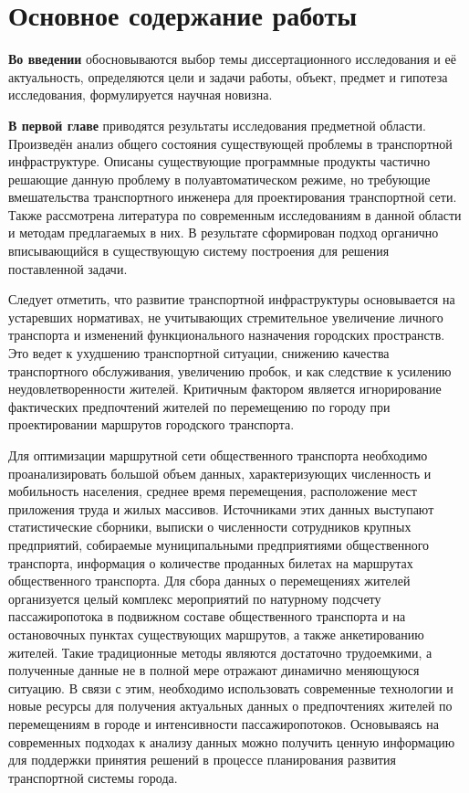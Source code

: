 \section{Основное содержание работы}
\textbf{Во введении} обосновываются выбор темы диссертационного исследования и её актуальность, определяются 
цели и задачи работы, объект, предмет и гипотеза исследования, формулируется научная новизна.

\textbf{В первой главе} приводятся результаты исследования предметной области. Произведён анализ общего 
состояния существующей проблемы в транспортной инфраструктуре. Описаны существующие программные продукты 
частично решающие данную проблему в полуавтоматическом режиме, но требующие вмешательства транспортного 
инженера для проектирования транспортной сети. Также рассмотрена литература по современным исследованиям в 
данной области и методам предлагаемых в них. В результате сформирован подход органично вписывающийся в 
существующую систему построения для решения поставленной задачи.

Следует отметить, что развитие транспортной инфраструктуры основывается на устаревших нормативах, не 
учитывающих стремительное увеличение личного транспорта и изменений функционального назначения городских 
пространств. Это ведет к ухудшению транспортной ситуации, снижению качества транспортного обслуживания, 
увеличению пробок, и как следствие к усилению неудовлетворенности жителей. Критичным фактором является 
игнорирование фактических предпочтений жителей по перемещению по городу при проектировании маршрутов 
городского транспорта.

Для оптимизации маршрутной сети общественного транспорта необходимо проанализировать большой объем данных, 
характеризующих численность и мобильность населения, среднее время перемещения, расположение мест приложения 
труда и жилых массивов. Источниками этих данных выступают статистические сборники, выписки о численности 
сотрудников крупных предприятий, собираемые муниципальными предприятиями общественного транспорта, 
информация о количестве проданных билетах на маршрутах общественного транспорта. Для сбора данных о 
перемещениях жителей организуется целый комплекс мероприятий по натурному подсчету пассажиропотока в 
подвижном составе общественного транспорта и на остановочных пунктах существующих маршрутов, а также 
анкетированию жителей. Такие традиционные методы являются достаточно трудоемкими, а полученные данные не в 
полной мере отражают динамично меняющуюся ситуацию. В связи с этим, необходимо использовать современные 
технологии и новые ресурсы для получения актуальных данных о предпочтениях жителей по перемещениям в городе 
и интенсивности пассажиропотоков. Основываясь на современных подходах к анализу данных можно получить 
ценную информацию для поддержки принятия решений в процессе планирования развития транспортной системы 
города.

